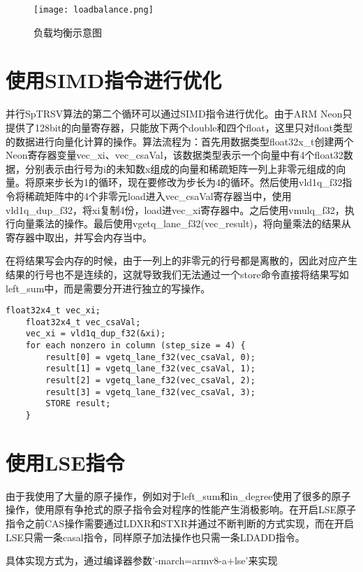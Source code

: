 \begin{figure}[htbp]
    \centering
    \texttt{[image: loadbalance.png]}
    \caption{负载均衡示意图}
    \label{负载均衡示意图}
\end{figure}



\section{使用SIMD指令进行优化}

并行SpTRSV算法的第二个循环可以通过SIMD指令进行优化。由于ARM Neon只提供了128bit的向量寄存器，只能放下两个double和四个float，这里只对float类型的数据进行向量化计算的操作。算法流程为：首先用数据类型float32x\_t创建两个Neon寄存器变量vec\_xi、vec\_csaVal，该数据类型表示一个向量中有4个float32数据，分别表示由行号为i的未知数x组成的向量和稀疏矩阵一列上非零元组成的向量。将原来步长为1的循环，现在要修改为步长为4的循环。然后使用vld1q\_f32指令将稀疏矩阵中的4个非零元load进入vec\_csaVal寄存器当中，使用vld1q\_dup\_f32，将xi复制4份，load进vec\_xi寄存器中。之后使用vmulq\_f32，执行向量乘法的操作。最后使用vgetq\_lane\_f32(vec\_result)，将向量乘法的结果从寄存器中取出，并写会内存当中。

在将结果写会内存的时候，由于一列上的非零元的行号都是离散的，因此对应产生结果的行号也不是连续的，这就导致我们无法通过一个store命令直接将结果写如left\_sum中，而是需要分开进行独立的写操作。

\begin{lstlisting}[caption={SIMD指令优化}]
    float32x4_t vec_xi;
    float32x4_t vec_csaVal;
    vec_xi = vld1q_dup_f32(&xi);
    for each nonzero in column (step_size = 4) {
        result[0] = vgetq_lane_f32(vec_csaVal, 0);
        result[1] = vgetq_lane_f32(vec_csaVal, 1);
        result[2] = vgetq_lane_f32(vec_csaVal, 2);
        result[3] = vgetq_lane_f32(vec_csaVal, 3);
        STORE result;
    }
\end{lstlisting}

\section{使用LSE指令}

由于我使用了大量的原子操作，例如对于left\_sum和in\_degree使用了很多的原子操作，使用原有争抢式的原子指令会对程序的性能产生消极影响。在开启LSE原子指令之前CAS操作需要通过LDXR和STXR并通过不断判断的方式实现，而在开启LSE只需一条casal指令，同样原子加法操作也只需一条LDADD指令。

具体实现方式为，通过编译器参数'-march=armv8-a+lse'来实现

